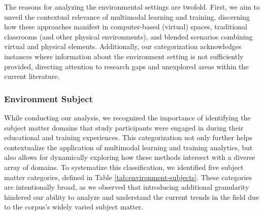 \documentclass[manuscript,screen,review]{acmart}
\begin{document}
The reasons for analyzing the environmental settings are twofold. First, we aim to unveil the contextual relevance of multimodal learning and training, discerning how these approaches manifest in computer-based (virtual) spaces, traditional classrooms (and other physical environments), and blended scenarios combining virtual and physical elements. Additionally, our categorization acknowledges instances where information about the environment setting is not sufficiently provided, directing attention to research gaps and unexplored areas within the current literature.


\subsubsection{Environment Subject} \label{subsec:environment_subject}

While conducting our analysis, we recognized the importance of identifying the subject matter domains that study participants were engaged in during their educational and training experiences. This categorization not only further helps contextualize the application of multimodal learning and training analytics, but also allows for dynamically exploring how these methods intersect with a diverse array of domains. To systematize this classification, we identified five subject matter categories, defined in Table \ref{tab:environment-subjects}. These categories are intentionally broad, as we observed that introducing additional granularity %
hindered our ability to analyze and understand the current trends in the field due to the corpus's widely varied subject matter.
\end{document}
